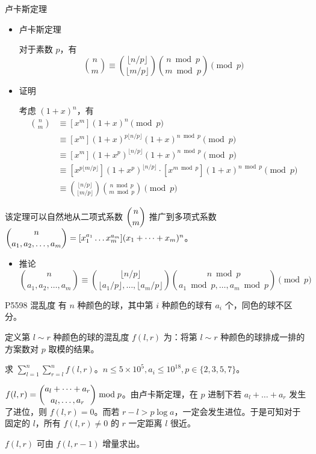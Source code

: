 \documentclass [hyperref={bookmarksdepth=4}, aspectratio=169] {beamer}
\theoremstyle {fy}
\begin{document}
\begin{frame}{卢卡斯定理}
\begin{itemize}
    \item 卢卡斯定理

  对于素数 $p$，有
  $$
  \binom{n}{m}\equiv\binom{\lfloor n/p\rfloor}{\lfloor m/p\rfloor}\binom{n\bmod p}{m\bmod p}\pmod p
  $$

    \item 证明

  考虑 $(1+x)^n$，有
  $$
  \begin{aligned}
  \binom{n}{m}&\equiv [x^m](1+x)^n \pmod p\\
  &\equiv [x^m](1+x)^{p\lfloor n/p\rfloor}(1+x)^{n\bmod p}\pmod p\\
  &\equiv [x^m](1+x^p)^{\lfloor n/p\rfloor}(1+x)^{n\bmod p}\pmod p\\
  &\equiv[x^{p\lfloor m/p\rfloor}](1+x^p)^{\lfloor n/p\rfloor}\cdot[x^{m\bmod p}](1+x)^{n\bmod p}\pmod p\\
  &\equiv \binom{\lfloor n/p\rfloor}{\lfloor m/p\rfloor}\binom{n\bmod p}{m\bmod p}\pmod p
  \end{aligned}
  $$
\end{itemize}

该定理可以自然地从二项式系数 $\dbinom{n}{m}$ 推广到多项式系数 $\dbinom{n}{a_1,a_2,\dots,a_m}=[x_1^{a_1}\dots x_m^{a_m}](x_1+\dots+x_m)^n$。

\begin{itemize}
    \item 推论
  $$
  \binom{n}{a_1,a_2,\dots,a_m}\equiv \binom{\lfloor n/p\rfloor}{\lfloor a_1/p\rfloor,\dots,\lfloor a_m/p\rfloor}\binom{n\bmod p}{a_1\bmod p,\dots,a_m\bmod p}\pmod p
  $$
\end{itemize}
\end{frame}

\begin{frame}{P5598 混乱度}
有 $n$ 种颜色的球，其中第 $i$ 种颜色的球有 $a_i$ 个，同色的球不区分。

定义第 $l\sim r$ 种颜色的球的混乱度 $f(l,r)$ 为：将第 $l\sim r$ 种颜色的球排成一排的方案数对 $p$ 取模的结果。

求 $\sum\limits_{l=1}^n\sum\limits_{r=l}^nf(l,r)$。$n\le 5\times10^5,a_i\le10^{18},p\in\{2,3,5,7\}$。

$f(l,r)=\dbinom{a_{l}+\dots+a_r}{a_l,\dots,a_r}\bmod p$。由卢卡斯定理，在 $p$ 进制下若 $a_l+\dots+a_r$ 发生了进位，则 $f(l,r)=0$。而若 $r-l>p\log a$，一定会发生进位。于是可知对于固定的 $l$，所有 $f(l,r)\neq 0$ 的 $r$ 一定距离 $l$ 很近。

$f(l,r)$ 可由 $f(l,r-1)$ 增量求出。
\end{frame}
\end{document}
